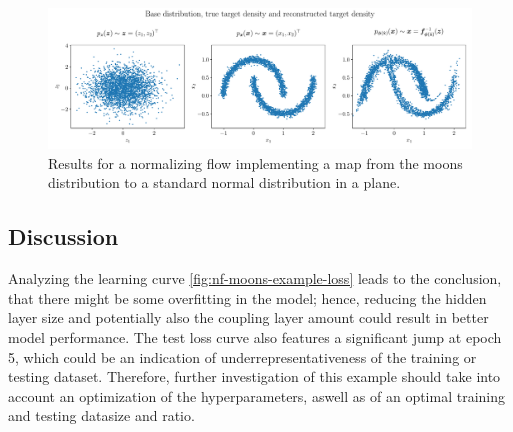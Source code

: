 \documentclass[a4paper,12pt]{report}
\begin{document}
\begin{figure}[h!]
\centering
\includegraphics[width=\textwidth]{figures/nf-moons-example-plots.pdf}
\caption{Results for a normalizing flow implementing a map from the moons distribution to a standard normal distribution in a plane.}
\label{fig:nf-moons-example-plots}
\end{figure}

\subsection{Discussion}
Analyzing the learning curve \cref{fig:nf-moons-example-loss} leads to the conclusion, that there might be some overfitting in the model; hence, reducing the hidden layer size and potentially also the coupling layer amount could result in better model performance. The test loss curve also features a significant jump at epoch 5, which could be an indication of underrepresentativeness of the training or testing dataset. Therefore, further investigation of this example should take into account an optimization of the hyperparameters, aswell as of an optimal training and testing datasize and ratio.
\end{document}
